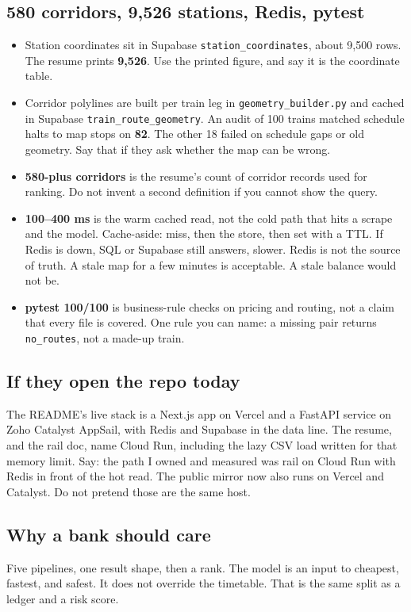 \documentclass[a4paper,9.5pt]{extarticle}
\begin{document}
\subsection{580 corridors, 9{,}526 stations, Redis, pytest}
\begin{itemize}
  \item Station coordinates sit in Supabase \texttt{station\_coordinates}, about 9{,}500 rows. The resume prints \textbf{9{,}526}. Use the printed figure, and say it is the coordinate table.
  \item Corridor polylines are built per train leg in \texttt{geometry\_builder.py} and cached in Supabase \texttt{train\_route\_geometry}. An audit of 100 trains matched schedule halts to map stops on \textbf{82}. The other 18 failed on schedule gaps or old geometry. Say that if they ask whether the map can be wrong.
  \item \textbf{580-plus corridors} is the resume's count of corridor records used for ranking. Do not invent a second definition if you cannot show the query.
  \item \textbf{100--400 ms} is the warm cached read, not the cold path that hits a scrape and the model. Cache-aside: miss, then the store, then set with a TTL. If Redis is down, SQL or Supabase still answers, slower. Redis is not the source of truth. A stale map for a few minutes is acceptable. A stale balance would not be.
  \item \textbf{pytest 100/100} is business-rule checks on pricing and routing, not a claim that every file is covered. One rule you can name: a missing pair returns \texttt{no\_routes}, not a made-up train.
\end{itemize}

\subsection{If they open the repo today}
The README's live stack is a Next.js app on Vercel and a FastAPI service on Zoho Catalyst AppSail, with Redis and Supabase in the data line. The resume, and the rail doc, name Cloud Run, including the lazy CSV load written for that memory limit. Say: the path I owned and measured was rail on Cloud Run with Redis in front of the hot read. The public mirror now also runs on Vercel and Catalyst. Do not pretend those are the same host.

\subsection{Why a bank should care}
Five pipelines, one result shape, then a rank. The model is an input to cheapest, fastest, and safest. It does not override the timetable. That is the same split as a ledger and a risk score.
\end{document}
